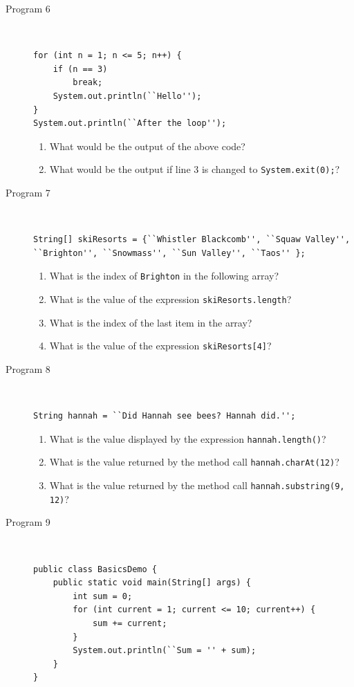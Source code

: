 \documentclass[11pt,a4paper]{article}
\def\AnswerBox{\fbox{\begin{minipage}{4in}\hfill\vspace{0.5in}\end{minipage}}}
\begin{document}
\begin{description}
\item [Program 6]\
\begin{lstlisting}
for (int n = 1; n <= 5; n++) {
    if (n == 3)
        break;
    System.out.println(``Hello'');
}
System.out.println(``After the loop'');
\end{lstlisting}
\begin{enumerate}[label=\bfseries Q\arabic*:]\itemsep10pt
\item What would be the output of the above code?
\item What would be the output if line 3 is changed to \texttt{System.exit(0);}?
\end{enumerate}
\item [Program 7]\
\begin{lstlisting}
String[] skiResorts = {``Whistler Blackcomb'', ``Squaw Valley'', ``Brighton'', ``Snowmass'', ``Sun Valley'', ``Taos'' };
\end{lstlisting}
\begin{enumerate}[label=\bfseries Q\arabic*:]\itemsep10pt
\item What is the index of \texttt{Brighton} in the following array?
\item What is the value of the expression \texttt{skiResorts.length}?
\item What is the index of the last item in the array?
\item What is the value of the expression \texttt{skiResorts[4]}?
\end{enumerate}

\item [Program 8]\
\begin{lstlisting}
String hannah = ``Did Hannah see bees? Hannah did.'';
\end{lstlisting}

\AnswerBox

\begin{enumerate}[label=\bfseries Q\arabic*:]\itemsep10pt
\item What is the value displayed by the expression \texttt{hannah.length()}?
\item What is the value returned by the method call \texttt{hannah.charAt(12)}?
\item What is the value returned by the method call \texttt{hannah.substring(9, 12)}?
\end{enumerate}

\item [Program 9]\
\begin{lstlisting}
public class BasicsDemo {
    public static void main(String[] args) {
        int sum = 0;
        for (int current = 1; current <= 10; current++) {
            sum += current;
        }
        System.out.println(``Sum = '' + sum);
    }
}
\end{lstlisting}


\end{description}
\end{document}
